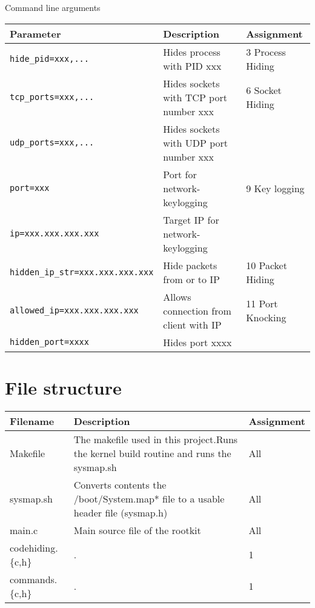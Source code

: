\begin{subsubsection}{Command line arguments}
\label{sec:arg}
\begin{center}
\begin{tabularx}{\textwidth}{|l|X|X|}
\hline
Parameter & Description & Assignment\\\hline
\texttt{hide\_pid=xxx,...} & Hides process with PID xxx & 3 Process Hiding
\\ \hline
\texttt{tcp\_ports=xxx,...}& Hides sockets with TCP port number xxx& 6 Socket 
Hiding 
\\ \cline{1-2}
\texttt{udp\_ports=xxx,...}& Hides sockets with UDP port number xxx& \\ \hline
\texttt{port=xxx} & Port for network-keylogging&9 Key logging
\\ \cline{1-2}
\texttt{ip=xxx.xxx.xxx.xxx} & Target IP for network-keylogging& \\ \hline
\texttt{hidden\_ip\_str=xxx.xxx.xxx.xxx} & Hide packets from or to IP & 10 Packet Hiding
\\\hline
\texttt{allowed\_ip=xxx.xxx.xxx.xxx} & Allows connection from client with IP & 
11 Port Knocking
\\\cline{1-2}
\texttt{hidden\_port=xxxx} & Hides port xxxx & \\ \hline
\end{tabularx}
\end{center}
\end{subsubsection}

\section{File structure}
\begin{tabularx}{\textwidth}{|X|X|X|}
\hline
Filename & Description & Assignment \\ \hline
Makefile & The makefile used in this project.\newline Runs the kernel 
build routine and runs the sysmap.sh & All \\ \hline
sysmap.sh & Converts contents the /boot/System.map* file to a usable header 
file (sysmap.h) & All \\ \hline
main.c & Main source file of the rootkit & All \\ \hline
codehiding.\{c,h\} & . & 1 \\ \hline
commands.\{c,h\} & . &1 \\ \hline
\end{tabularx}
